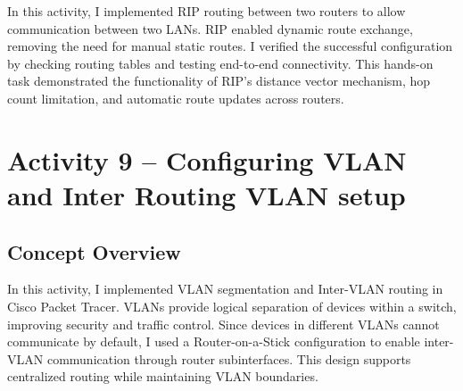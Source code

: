 \documentclass[11pt,a4paper]{article}
\begin{document}
In this activity, I implemented RIP routing between two routers to allow communication between two LANs. RIP enabled dynamic route exchange, removing the need for manual static routes. I verified the successful configuration by checking routing tables and testing end-to-end connectivity. This hands-on task demonstrated the functionality of RIP’s distance vector mechanism, hop count limitation, and automatic route updates across routers.

\section{Activity 9 – Configuring VLAN and Inter Routing VLAN setup }

\subsection{Concept Overview}
In this activity, I implemented VLAN segmentation and Inter-VLAN routing in Cisco Packet Tracer. VLANs provide logical separation of devices within a switch, improving security and traffic control. Since devices in different VLANs cannot communicate by default, I used a Router-on-a-Stick configuration to enable inter-VLAN communication through router subinterfaces. This design supports centralized routing while maintaining VLAN boundaries.
\end{document}
